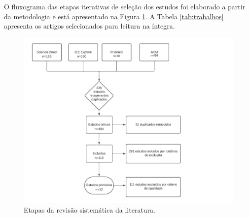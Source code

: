 O fluxograma das etapas iterativas de seleção dos estudos foi elaborado a partir
da metodologia e está apresentado na Figura \ref{fig:fluxoslr}. A Tabela \ref{tab:trabalhos} apresenta os artigos selecionados para leitura na íntegra.

\begin{figure}[H]
   \centering
   \includegraphics[width=0.8\linewidth]{capitulos/figuras/diagrama_slr.jpeg}
   \caption{Etapas da revisão sistemática da literatura.}
   \label{fig:fluxoslr}
\end{figure}

